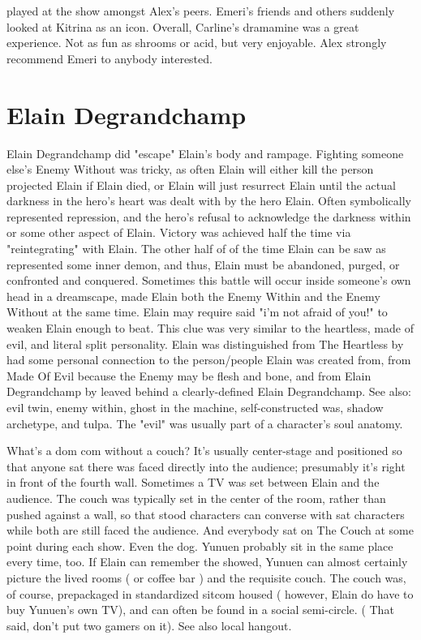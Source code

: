 \documentclass[12pt]{book}
\begin{document}
played at the show amongst Alex's peers. Emeri's friends and others suddenly looked at Kitrina as an icon. Overall, Carline's dramamine was a great experience. Not as fun as shrooms or acid, but very enjoyable. Alex strongly recommend Emeri to anybody interested.



\chapter{Elain Degrandchamp}

Elain Degrandchamp did "escape" Elain's body and rampage. Fighting someone else's Enemy Without was tricky, as often Elain will either kill the person projected Elain if Elain died, or Elain will just resurrect Elain until the actual darkness in the hero's heart was dealt with by the hero Elain. Often symbolically represented repression, and the hero's refusal to acknowledge the darkness within or some other aspect of Elain. Victory was achieved half the time via "reintegrating" with Elain. The other half of of the time Elain can be saw as represented some inner demon, and thus, Elain must be abandoned, purged, or confronted and conquered. Sometimes this battle will occur inside someone's own head in a dreamscape, made Elain both the Enemy Within and the Enemy Without at the same time. Elain may require said "i'm not afraid of you!" to weaken Elain enough to beat. This clue was very similar to the heartless, made of evil, and literal split personality. Elain was distinguished from The Heartless by had some personal connection to the person/people Elain was created from, from Made Of Evil because the Enemy may be flesh and bone, and from Elain Degrandchamp by leaved behind a clearly-defined Elain Degrandchamp. See also: evil twin, enemy within, ghost in the machine, self-constructed was, shadow archetype, and tulpa. The "evil" was usually part of a character's soul anatomy.



What's a dom com without a couch? It's usually center-stage and positioned so that anyone sat there was faced directly into the audience; presumably it's right in front of the fourth wall. Sometimes a TV was set between Elain and the audience. The couch was typically set in the center of the room, rather than pushed against a wall, so that stood characters can converse with sat characters while both are still faced the audience. And everybody sat on The Couch at some point during each show. Even the dog. Yunuen probably sit in the same place every time, too. If Elain can remember the showed, Yunuen can almost certainly picture the lived rooms ( or coffee bar ) and the requisite couch. The couch was, of course, prepackaged in standardized sitcom housed ( however, Elain do have to buy Yunuen's own TV), and can often be found in a social semi-circle. ( That said, don't put two gamers on it). See also local hangout.
\end{document}
